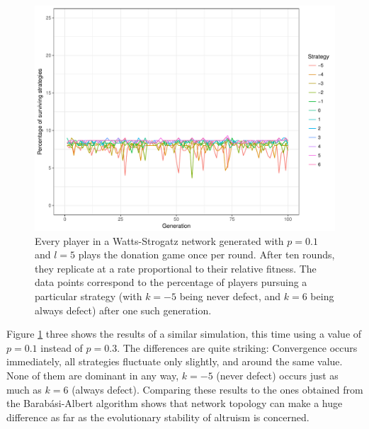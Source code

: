 \documentclass{JASSS}
\begin{document}
\begin{figure}
	\centering
	\includegraphics[width=\linewidth]{./figures/results_WS_300_default.pdf}
	\caption{Every player in a Watts-Strogatz network generated with $p=0.1$ and $l=5$ plays the donation game once per round. After ten rounds, they replicate at a rate proportional to their relative fitness. The data points correspond to the percentage of players pursuing a particular strategy (with $k=-5$ being never defect, and $k=6$ being always defect) after one such generation.}
	\label{WS_300_default}
\end{figure}

Figure \ref{WS_300_default} three shows the results of a similar simulation, this time using a value of $p=0.1$ instead of $p=0.3$. The differences are quite striking: Convergence occurs immediately, all strategies fluctuate only slightly, and around the same value. None of them are dominant in any way, $k=-5$ (never defect) occurs just as much as $k=6$ (always defect). Comparing these results to the ones obtained from the Barab\'{a}si-Albert algorithm shows that network topology can make a huge difference as far as the evolutionary stability of altruism is concerned.
\end{document}
